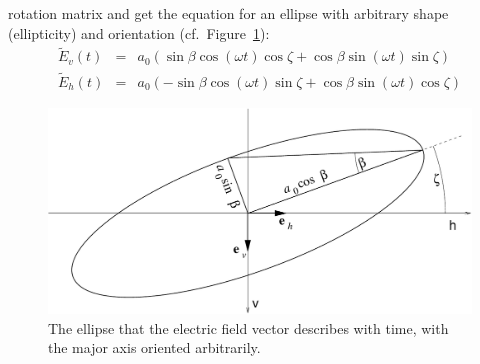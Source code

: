 rotation matrix and get the equation for an ellipse with arbitrary
shape (ellipticity) and orientation (cf.\
Figure~\ref{fig:polarization:ellipse_arbitrary}):
\begin{eqnarray}
  \label{eq:polarization:ellipse_rotated1}
 \tilde{E}_v (t) &=&  a_0(  \sin\beta \cos(\omega t) \cos\zeta
                           +\cos\beta \sin(\omega t) \sin\zeta )\\
  \label{eq:polarization:ellipse_rotated2}
 \tilde{E}_h (t) &=&  a_0( -\sin\beta \cos(\omega t) \sin\zeta
                           +\cos\beta \sin(\omega t) \cos\zeta )
\end{eqnarray}
%
\begin{figure}[!h]
 \begin{center}
  \begin{minipage}[c]{0.9\textwidth}
   \begin{center}
    \includegraphics*[width=0.9\hsize]{Figs/pol_ellipse_arbitrary}
   \end{center}
  \end{minipage}
  \begin{minipage}[c]{0.9\textwidth}
   \caption{The ellipse that the electric field vector describes with
     time, with the major axis oriented arbitrarily.}
   \label{fig:polarization:ellipse_arbitrary}
  \end{minipage}
 \end{center}
\end{figure}   


